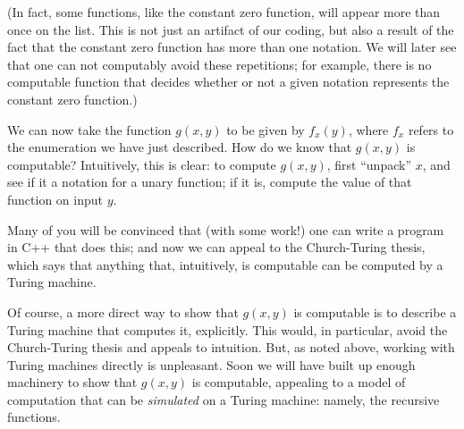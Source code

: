 \documentclass[../../include/open-logic-section]{subfiles}
\begin{document}
(In fact, some functions, like the constant zero function, will appear
more than once on the list. This is not just an artifact of our
coding, but also a result of the fact that the constant zero function has
more than one notation. We will later see that one can not computably
avoid these repetitions; for example, there is no computable function
that decides whether or not a given notation represents the constant
zero function.)

We can now take the function $g(x,y)$ to be given by $f_x(y)$, where
$f_x$ refers to the enumeration we have just described. How do we know
that $g(x,y)$ is computable? Intuitively, this is clear: to compute
$g(x,y)$, first ``unpack'' $x$, and see if it a notation for a unary
function; if it is, compute the value of that function on input
$y$. 

\begin{digress}
Many of you will be convinced that (with some work!) one can
write a program in C++ that does this; and now we can appeal to the
Church-Turing thesis, which says that anything that, intuitively, is
computable can be computed by a Turing machine. 

Of course, a more direct way to show that $g(x,y)$ is computable is to
describe a Turing machine that computes it, explicitly. This would,
in particular, avoid the Church-Turing thesis and appeals to
intuition. But, as noted above, working with Turing machines directly is
unpleasant. Soon we will have built up enough machinery to show
that $g(x,y)$ is computable, appealing to a model of computation that
can be \emph{simulated} on a Turing machine: namely, the recursive
functions.
\end{digress}
\end{document}
